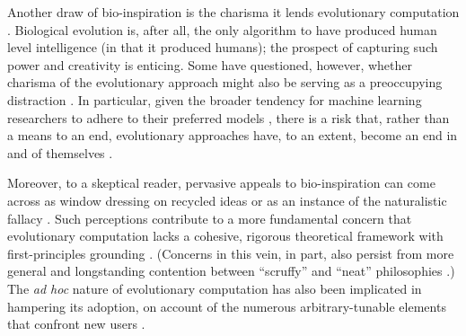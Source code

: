 Another draw of bio-inspiration is the charisma it lends evolutionary computation \citep{lehman2020surprising}.
Biological evolution is, after all, the only algorithm to have produced human level intelligence (in that it produced humans); the prospect of capturing such power and creativity is enticing.
Some have questioned, however, whether charisma of the evolutionary approach might also be serving as a preoccupying distraction \citep{moore2023evolution,sorensen2015metaheuristics}.
In particular, given the broader tendency for machine learning researchers to adhere to their preferred models \citep{domingos2012few}, there is a risk that, rather than a means to an end, evolutionary approaches have, to an extent, become an end in and of themselves \citep{woodward2016gp,yampolskiy2018we}.


Moreover, to a skeptical reader, pervasive appeals to bio-inspiration can come across as window dressing on recycled ideas or as an instance of the naturalistic fallacy \citep{wortmann2020does,sorensen2015metaheuristics}.
Such perceptions contribute to a more fundamental concern that evolutionary computation lacks a cohesive, rigorous theoretical framework with first-principles grounding \citep{worzel2003genetic}.
(Concerns in this vein, in part, also persist from more general and longstanding contention between ``scruffy'' and ``neat'' philosophies \citep[p. 16]{jones2008artificial} \citep{minsky1991logical}.)
The \textit{ad hoc} nature of evolutionary computation has also been implicated in hampering its adoption, on account of the numerous arbitrary-tunable elements that confront new users \citep{oneil2010open}.

